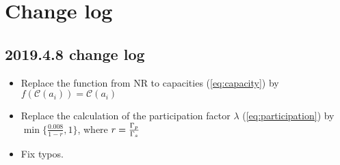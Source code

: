 \section{Change log}
\subsection{2019.4.8 change log}
\begin{itemize}
	\item Replace the function from NR to capacities (\ref{eq:capacity}) by  $f(\mathcal{C}(a_i))=\mathcal{C}(a_i)$
	\item Replace the calculation of the participation factor $\lambda$ (\ref{eq:participation}) by $\min\{\frac{0.008}{1-r},1\}$, where $r=\frac{\Gamma_p}{\Gamma_s}$
	\item Fix typos.
\end{itemize}